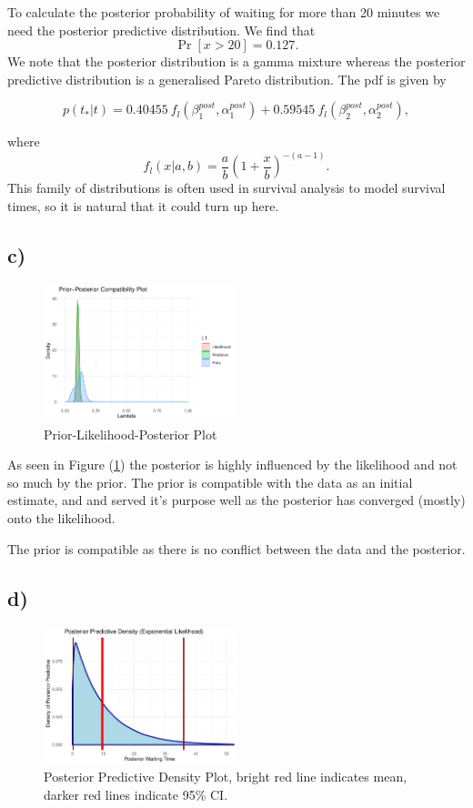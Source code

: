 \documentclass[10pt]{extarticle}
\begin{document}
To calculate the posterior probability of waiting for more than 20 minutes we need the posterior predictive distribution. We find that $$\Pr[x>20] = 0.127.$$ We note that the posterior distribution is a gamma mixture whereas the posterior predictive distribution is a generalised Pareto distribution. The pdf is given by 

\[
p(t_*|t) = 0.40455 \ f_l(\beta_1^{post}, \alpha_1^{post}) + 0.59545 \ f_l(\beta_2^{post}, \alpha_2^{post}),
\]

where 
\[
f_l(x|a,b) = \frac{a}{b}\left(1+\frac{x}{b}\right)^{-(a-1)}.
\]
This family of distributions is often used in survival analysis to model survival times, so it is natural that it could turn up here.

\subsection*{c)}
\begin{figure}[H]
	\centering
	\includegraphics[width = 0.5\textwidth]{../plpgoodnessplot}
	\caption{Prior-Likelihood-Posterior Plot}
	\label{fig:pgof}
\end{figure}

As seen in Figure (\ref{fig:pgof}) the posterior is highly influenced by the likelihood and not so much by the prior. The prior is compatible with the data as an initial estimate, and and served it's purpose well as the posterior has converged (mostly) onto the likelihood.

The prior is compatible as there is no conflict between the data and the posterior.

\subsection*{d)}
\begin{figure}[H]
	\centering
	\includegraphics[width = 0.5\textwidth]{../postpreddens}
	\caption{Posterior Predictive Density Plot, bright red line indicates mean, darker red lines indicate 95\% CI.}
	\label{fig:postpreddens}
\end{figure}
\end{document}
